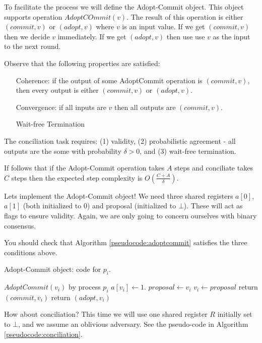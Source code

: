 \documentclass[twoside]{article}
\begin{document}
To facilitate the process we will define the Adopt-Commit object. This object supports operation $AdoptCOmmit(v)$. The result of this operation is either $(commit, v)$ or $(adopt, v)$ where $v$ is an input value. If we get $(commit, v)$ then we decide $v$ immediately. If we get $(adopt, v)$ then use use $v$ as the input to the next round. 

Observe that the following properties are satisfied:
\begin{enumerate}
\item[Coherence:] if the output of some AdoptCommit operation is $(commit, v)$, then every output is either $(commit, v)$ or $(adopt,v)$.  
\item[Convergence:] if all inputs are $v$ then all outputs are $(commit, v)$.
\item[Wait-free Termination]
\end{enumerate}

The conciliation task requires: (1) validity, (2) probabilistic agreement - all outputs are the some with probability $\delta > 0$, and (3) wait-free termination.

If follows that if the Adopt-Commit operation takes $A$ steps and conciliate takes $C$ steps then the expected step complexity is $O\left(\frac{C+A}{\delta}\right)$. 

Lets implement the Adopt-Commit object! We need three shared registers $a[0]$, $a[1]$ (both initialized to $0$) and proposal (initialized to $\bot$). These will act as flags to ensure validity. Again, we are only going to concern ourselves with binary consensus.

You should check that Algorithm \ref{pseudocode:adoptcommit} satisfies the three conditions above.

\begin{algorithm}[ht]
	\caption{Adopt-Commit object: code for $p_i$.}
    \label{pseudocode:adoptcommit}
    \begin{algorithmic}[1]
    \State $AdoptCommit(v_i)$ by process $p_i$
	\State $a[v_i] \leftarrow 1$.
		\State $proposal \leftarrow v_i$
	\Else
		\State $v_i \leftarrow proposal$
	\EndIf
		\State return $(commit, v_i)$
	\Else
		\State return $(adopt, v_i)$
	\EndIf
	\end{algorithmic}
\end{algorithm}

How about conciliation? This time we will use one shared register $R$ initially set to $\bot$, and we assume an oblivious adversary. See the pseudo-code in Algorithm \ref{pseudocode:conciliation}.
\end{document}
